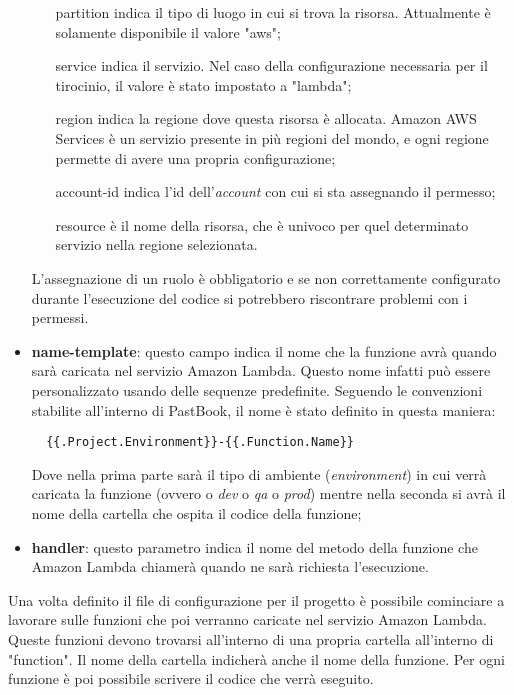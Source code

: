 \begin{itemize}
\begin{itemize}
    \item[partition] indica il tipo di luogo in cui si trova la risorsa.
Attualmente è solamente disponibile il valore "aws";

    \item[service] indica il servizio. Nel caso della configurazione necessaria
per il tirocinio, il valore è stato impostato a "lambda";

    \item[region] indica la regione dove questa risorsa è allocata. Amazon AWS
Services è un servizio presente in più regioni del mondo, e ogni regione
permette di avere una propria configurazione;

    \item[account-id] indica l'id dell'\textit{account} con cui si sta
assegnando il permesso;

    \item[resource] è il nome della risorsa, che è univoco per quel determinato
servizio nella regione selezionata.
  \end{itemize}
  L'assegnazione di un ruolo è obbligatorio e se non correttamente configurato
durante l'esecuzione del codice si potrebbero riscontrare problemi con i
permessi.

  \item \textbf{name-template}: questo campo indica il nome che la funzione
avrà quando sarà caricata nel servizio Amazon Lambda. Questo nome infatti può
essere personalizzato usando delle sequenze predefinite. Seguendo le
convenzioni stabilite all'interno di PastBook, il nome è stato definito in
questa maniera:
\begin{verbatim}
  {{.Project.Environment}}-{{.Function.Name}}
\end{verbatim}
Dove nella prima parte sarà il tipo di ambiente (\textit{environment}) in cui
verrà caricata la funzione (ovvero o \textit{dev} o \textit{qa} o
\textit{prod}) mentre nella seconda si avrà il nome della cartella che ospita
il codice della funzione;

  \item \textbf{handler}: questo parametro indica il nome del metodo della
funzione che Amazon Lambda chiamerà quando ne sarà richiesta l'esecuzione.
\end{itemize}


Una volta definito il file di configurazione per il progetto è possibile
cominciare a lavorare sulle funzioni che poi verranno caricate nel servizio
Amazon Lambda. Queste funzioni devono trovarsi all'interno di una propria
cartella all'interno di "function". Il nome della cartella indicherà anche il
nome della funzione. Per ogni funzione è poi possibile scrivere il codice che
verrà eseguito.

